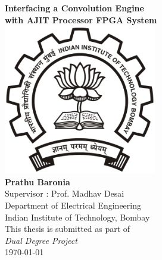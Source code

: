
\begin{titlepage}

\begin{center}

\huge \textbf{Interfacing a Convolution Engine\\ with AJIT Processor FPGA System}\\[2.5cm]

\includegraphics[width=0.5\textwidth]{images/logo.png}~\\[1cm]



{\Large \textbf{Prathu Baronia}}\\[0.5cm]
{\Large Supervisor : Prof. Madhav Desai}\\[0.5cm]

{\large Department of Electrical Engineering} \\ [-0.3cm]
{\large Indian Institute of Technology, Bombay}\\[1.5cm]

{ \large This thesis is submitted as part of \\ \textit{Dual Degree Project}}\\[1cm]



{\large \today}

\end{center}

\end{titlepage}
\afterpage{\blankpage}
\clearpage
